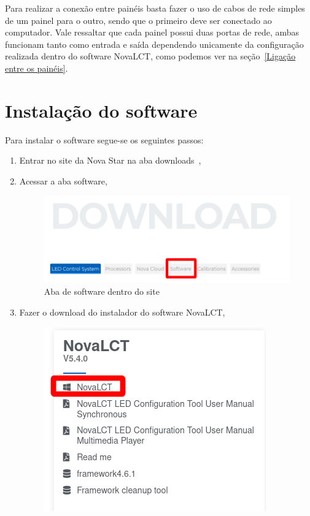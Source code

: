 \documentclass[12pt, a4paper]{article}
\begin{document}
Para realizar a conexão entre painéis basta fazer o uso de cabos de rede simples de um painel para o outro, sendo que o primeiro deve ser conectado ao computador. Vale ressaltar que cada painel possui duas portas de rede, ambas funcionam tanto como entrada e saída dependendo unicamente da configuração realizada dentro do software NovaLCT, como podemos ver na seção~\ref{Ligação entre os painéis}.

\newpage
\section{Instalação do software}\label{Instalação do software}
Para instalar o software segue-se os seguintes passos:
\begin{enumerate}
	\item Entrar no site da Nova Star na aba downloads~\cite{siteDownload},
	\item Acessar a aba software,
		\begin{figure}[!htb]
			\centering
			\includegraphics[width=\textwidth]{Download.png}
			\caption{\label{fig:Download}Aba de software dentro do site~\cite{siteDownload}}
		\end{figure}
	\item Fazer o download do instalador do software NovaLCT,
		\begin{figure}[!htb]
			\centering
			\includegraphics[scale=.9]{NOVALCT_INSTALL.png}

\end{figure}
\end{enumerate}
\end{document}
